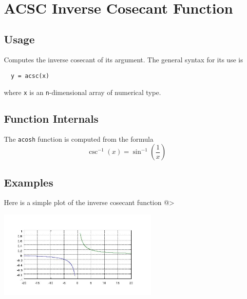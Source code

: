 \section{ACSC Inverse Cosecant Function}

\subsection{Usage}

Computes the inverse cosecant of its argument.  The general
syntax for its use is
\begin{verbatim}
  y = acsc(x)
\end{verbatim}
where \verb|x| is an \verb|n|-dimensional array of numerical type.
\subsection{Function Internals}

The \verb|acosh| function is computed from the formula
\[
   \csc^{-1}(x) = \sin^{-1}\left(\frac{1}{x}\right)
\]
\subsection{Examples}

Here is a simple plot of the inverse cosecant function
@>


\centerline{\includegraphics[width=8cm]{acschplot}}

